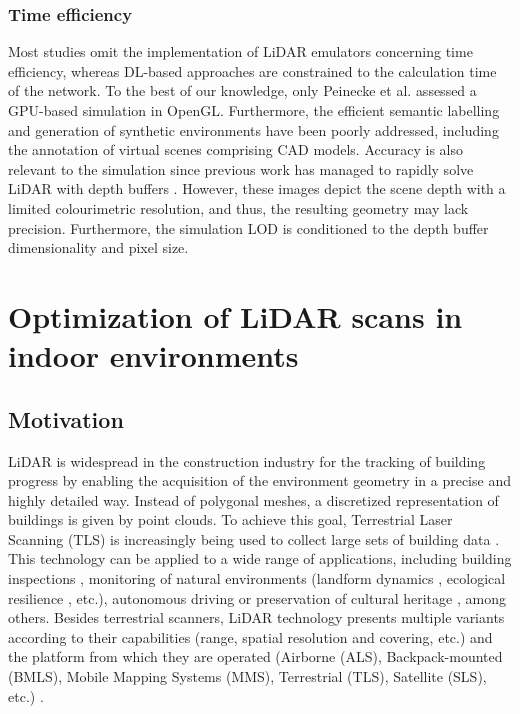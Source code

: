 \subsubsection{Time efficiency}

Most studies omit the implementation of LiDAR emulators concerning time efficiency, whereas DL-based approaches are constrained to the calculation time of the network. To the best of our knowledge, only Peinecke et al. \cite{peinecke_lidar_2008} assessed a GPU-based simulation in OpenGL. Furthermore, the efficient semantic labelling and generation of synthetic environments have been poorly addressed, including the annotation of virtual scenes comprising CAD models. Accuracy is also relevant to the simulation since previous work has managed to rapidly solve LiDAR with depth buffers \cite{su_simulation_2019, fang_augmented_2020, manivasagam_lidarsim_2020}. However, these images depict the scene depth with a limited colourimetric resolution, and thus, the resulting geometry may lack precision. Furthermore, the simulation LOD is conditioned to the depth buffer dimensionality and pixel size.

\section{Optimization of LiDAR scans in indoor environments}

\subsection{Motivation} 

LiDAR is widespread in the construction industry for the tracking of building progress by enabling the acquisition of the environment geometry in a precise and highly detailed way. Instead of polygonal meshes, a discretized representation of buildings is given by point clouds. To achieve this goal, Terrestrial Laser Scanning (TLS) is increasingly being used to collect large sets of building data \cite{pandzic_error_2017}. This technology can be applied to a wide range of applications, including building inspections \cite{shariq_revolutionising_2020}, monitoring of natural environments (landform dynamics \cite{guisado-pintado_3d_2019}, ecological resilience \cite{mitasova_geospatial_2010}, etc.), autonomous driving \cite{kuutti_survey_2021} or preservation of cultural heritage \cite{banfi_integration_2019, ham_phased_2020, andriasyan_point_2020}, among others. Besides terrestrial scanners, LiDAR technology presents multiple variants according to their capabilities (range, spatial resolution and covering, etc.) and the platform from which they are operated (Airborne (ALS), Backpack-mounted (BMLS), Mobile Mapping Systems (MMS), Terrestrial (TLS), Satellite (SLS), etc.) \cite{poux_smart_2019, warchol_concept_2019}. 

